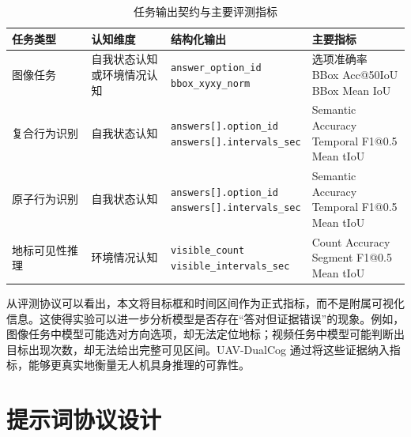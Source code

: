 \begin{table}[htbp]
    \centering
    \caption{任务输出契约与主要评测指标}
    \label{tab:evaluation-protocol}
    \small
    \setlength{\tabcolsep}{4pt}
    \begin{tabularx}{\textwidth}{@{}p{3.0cm}p{2.2cm}p{3.5cm}X@{}}
        \toprule
        任务类型 & 认知维度 & 结构化输出 & 主要指标 \\
        \midrule
        图像任务 & \makecell[l]{自我状态认知\\或环境情况认知} & \makecell[l]{\texttt{answer\_option\_id}\\\texttt{bbox\_xyxy\_norm}} & \makecell[l]{选项准确率\\BBox Acc@50IoU\\BBox Mean IoU} \\
        复合行为识别 & 自我状态认知 & \makecell[l]{\texttt{answers[].option\_id}\\\texttt{answers[].intervals\_sec}} & \makecell[l]{Semantic Accuracy\\Temporal F1@0.5\\Mean tIoU} \\
        原子行为识别 & 自我状态认知 & \makecell[l]{\texttt{answers[].option\_id}\\\texttt{answers[].intervals\_sec}} & \makecell[l]{Semantic Accuracy\\Temporal F1@0.5\\Mean tIoU} \\
        地标可见性推理 & 环境情况认知 & \makecell[l]{\texttt{visible\_count}\\\texttt{visible\_intervals\_sec}} & \makecell[l]{Count Accuracy\\Segment F1@0.5\\Mean tIoU} \\
        \bottomrule
    \end{tabularx}
\end{table}

从评测协议可以看出，本文将目标框和时间区间作为正式指标，而不是附属可视化信息。这使得实验可以进一步分析模型是否存在“答对但证据错误”的现象。例如，图像任务中模型可能选对方向选项，却无法定位地标；视频任务中模型可能判断出目标出现次数，却无法给出完整可见区间。UAV-DualCog 通过将这些证据纳入指标，能够更真实地衡量无人机具身推理的可靠性。

\section{提示词协议设计}


